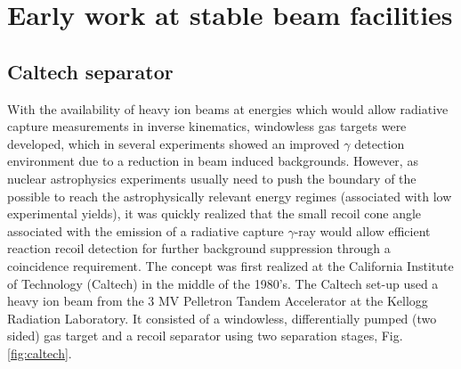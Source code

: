 \section{Early work at stable beam facilities}

\subsection{Caltech separator}

With the availability of heavy ion beams at energies which would allow radiative capture measurements in inverse kinematics, windowless gas targets were developed, which in several experiments showed an improved $\gamma$ detection environment due to a reduction in beam induced backgrounds. However, as nuclear astrophysics experiments usually need to push the boundary of the possible to reach the astrophysically relevant energy regimes (associated with low experimental yields), it was quickly realized that the small recoil cone angle associated with the emission of a radiative capture $\gamma$-ray would allow efficient reaction recoil detection for further background suppression through a coincidence requirement. The concept was first realized at the California Institute of Technology (Caltech) in the middle of the 1980's. The Caltech set-up used a heavy ion beam from the 3 MV Pelletron Tandem Accelerator at the Kellogg Radiation Laboratory. It consisted of a windowless, differentially pumped (two sided) gas target and a recoil separator using two separation stages, Fig. \ref{fig:caltech}.

